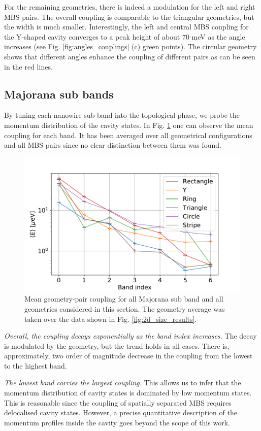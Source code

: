 For the remaining geometries, there is indeed a modulation for the left and right MBS pairs.
The overall coupling is comparable to the triangular geometries, but the width is much smaller.
Interestingly, the left and central MBS coupling for the Y-shaped cavity converges to a peak height of about $70$ meV as the angle increases (see Fig. \ref{fig:angles_couplings} (c) green points).
The circular geometry shows that different angles enhance the coupling of different pairs as can be seen in the red lines.

\subsection{Majorana sub bands}

By tuning each nanowire sub band into the topological phase, we probe the momentum distribution of the cavity states.
In Fig. \ref{fig:sub_bands} one can observe the mean coupling for each band.
It has been averaged over all geometrical configurations and all MBS pairs since no clear distinction between them was found.

\begin{figure}[h!]
\centering
  \includegraphics[width=0.6\linewidth]{figures/sub_bands_results.pdf}
  \caption{Mean geometry-pair coupling for all Majorana sub band and all geometries considered in this section. The geometry average was taken over the data shown in Fig. \ref{fig:2d_size_results}.}
  \label{fig:sub_bands}
\end{figure}

\textit{Overall, the coupling decays exponentially as the band index increases.}
The decay is modulated by the geometry, but the trend holds in all cases.
There is, approximately, two order of magnitude decrease in the coupling from the lowest to the highest band.

\textit{The lowest band carries the largest coupling.}
This allows us to infer that the momentum distribution of cavity states is dominated by low momentum states.
This is reasonable since the coupling of spatially separated MBS requires delocalised cavity states.
However, a precise quantitative description of the momentum profiles inside the cavity goes beyond the scope of this work.